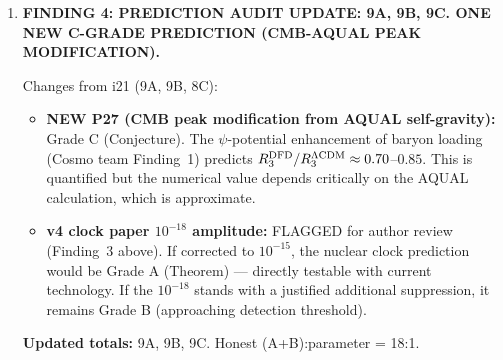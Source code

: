 \documentclass[11pt]{article}
\begin{document}
\begin{tcolorbox}[colback=blue!5!white, colframe=blue!70!black,
  title=\textbf{W4i22 TOP 5 FINDINGS --- PREDICTIONS TEAM}]
\begin{enumerate}
  \textbf{This requires AUTHOR CLARIFICATION.  Flagged as HIGH PRIORITY.}

  \textbf{Grade: B (Derivation) for the formula; UNRESOLVED for the
  numerical amplitude.}

\item \textbf{FINDING 4: PREDICTION AUDIT UPDATE: 9A, 9B, 9C.
  ONE NEW C-GRADE PREDICTION (CMB-AQUAL PEAK MODIFICATION).}

  Changes from i21 (9A, 9B, 8C):
  \begin{itemize}
  \item \textbf{NEW P27 (CMB peak modification from AQUAL self-gravity):}
    Grade C (Conjecture).  The $\psi$-potential enhancement of baryon
    loading (Cosmo team Finding~1) predicts $R_3^{\rm DFD}/R_3^{\Lambda\rm
    CDM} \approx 0.70$--$0.85$.  This is quantified but the numerical
    value depends critically on the AQUAL calculation, which is approximate.

  \item \textbf{v4 clock paper $10^{-18}$ amplitude:}  FLAGGED for
    author review (Finding~3 above).  If corrected to $10^{-15}$, the
    nuclear clock prediction would be Grade A (Theorem) --- directly
    testable with current technology.  If the $10^{-18}$ stands with
    a justified additional suppression, it remains Grade B (approaching
    detection threshold).
  \end{itemize}

  \textbf{Updated totals:} 9A, 9B, 9C.  Honest (A+B):parameter = 18:1.


\end{enumerate}
\end{tcolorbox}
\end{document}

